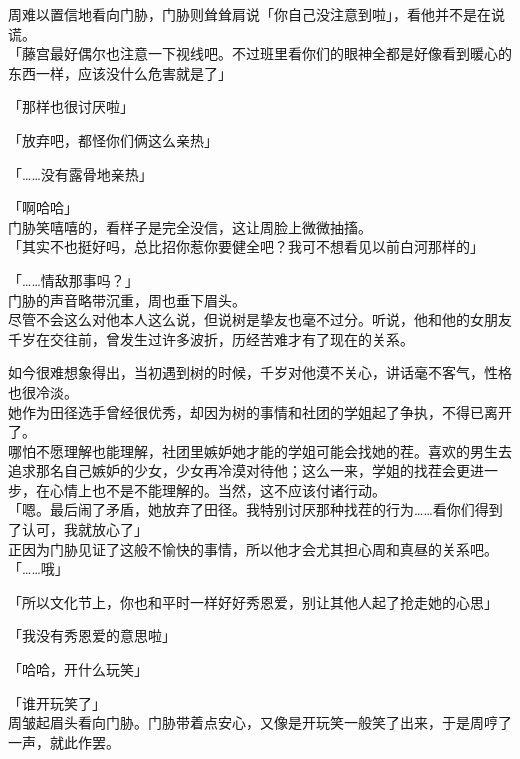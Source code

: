 周难以置信地看向门胁，门胁则耸耸肩说「你自己没注意到啦」，看他并不是在说谎。\\

「藤宫最好偶尔也注意一下视线吧。不过班里看你们的眼神全都是好像看到暖心的东西一样，应该没什么危害就是了」

「那样也很讨厌啦」

「放弃吧，都怪你们俩这么亲热」

「……没有露骨地亲热」

「啊哈哈」\\

门胁笑嘻嘻的，看样子是完全没信，这让周脸上微微抽搐。\\

「其实不也挺好吗，总比招你惹你要健全吧？我可不想看见以前白河那样的」

「……情敌那事吗？」\\

门胁的声音略带沉重，周也垂下眉头。\\

尽管不会这么对他本人这么说，但说树是挚友也毫不过分。听说，他和他的女朋友千岁在交往前，曾发生过许多波折，历经苦难才有了现在的关系。

如今很难想象得出，当初遇到树的时候，千岁对他漠不关心，讲话毫不客气，性格也很冷淡。\\

她作为田径选手曾经很优秀，却因为树的事情和社团的学姐起了争执，不得已离开了。\\

哪怕不愿理解也能理解，社团里嫉妒她才能的学姐可能会找她的茬。喜欢的男生去追求那名自己嫉妒的少女，少女再冷漠对待他；这么一来，学姐的找茬会更进一步，在心情上也不是不能理解的。当然，这不应该付诸行动。\\

「嗯。最后闹了矛盾，她放弃了田径。我特别讨厌那种找茬的行为……看你们得到了认可，我就放心了」\\

正因为门胁见证了这般不愉快的事情，所以他才会尤其担心周和真昼的关系吧。\\

「……哦」

「所以文化节上，你也和平时一样好好秀恩爱，别让其他人起了抢走她的心思」

「我没有秀恩爱的意思啦」

「哈哈，开什么玩笑」

「谁开玩笑了」\\

周皱起眉头看向门胁。门胁带着点安心，又像是开玩笑一般笑了出来，于是周哼了一声，就此作罢。
